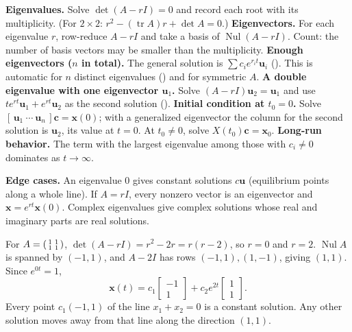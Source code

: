 \documentclass[10pt]{scrartcl}
\newcommand{\vv}[1]{\mathbf{#1}}
\DeclareMathOperator{\Nul}{Nul}
\DeclareMathOperator{\tr}{tr}
\newenvironment{howto}[1]{\begin{mdframed}[style=howtostyle,frametitle={#1}]}{\end{mdframed}}
\begin{document}
\begin{howto}{How to solve $\vv x'=A\vv x$ ($A$ constant) by the eigenvalue method}
  \begin{steps}
    \ii \textbf{Eigenvalues.} Solve $\det(A-rI)=0$ and record each root with its multiplicity. (For $2\times 2$: $r^2-(\tr A)r+\det A=0$.)
    \ii \textbf{Eigenvectors.} For each eigenvalue $r$, row-reduce $A-rI$ and take a basis of $\Nul(A-rI)$. Count: the number of basis vectors may be smaller than the multiplicity.
    \ii \textbf{Enough eigenvectors ($n$ in total).} The general solution is $\sum c_ie^{r_it}\vv u_i$ (). This is automatic for $n$ distinct eigenvalues () and for symmetric $A$.
    \ii \textbf{A double eigenvalue with one eigenvector $\vv u_1$.} Solve $(A-rI)\vv u_2=\vv u_1$ and use $te^{rt}\vv u_1+e^{rt}\vv u_2$ as the second solution ().
    \ii \textbf{Initial condition at $t_0=0$.} Solve $[\,\vv u_1\ \cdots\ \vv u_n\,]\vv c=\vv x(0)$; with a generalized eigenvector the column for the second solution is $\vv u_2$, its value at $t=0$. At $t_0\neq 0$, solve $X(t_0)\vv c=\vv x_0$.
    \ii \textbf{Long-run behavior.} The term with the largest eigenvalue among those with $c_i\neq 0$ dominates as $t\to\infty$.
  \end{steps}
  \textbf{Edge cases.} An eigenvalue $0$ gives constant solutions $c\vv u$ (equilibrium points along a whole line). If $A=rI$, every nonzero vector is an eigenvector and $\vv x=e^{rt}\vv x(0)$. Complex eigenvalues give complex solutions whose real and imaginary parts are real solutions.
\end{howto}

\begin{example*}
  For $A=\begin{psmallmatrix}1&1\\1&1\end{psmallmatrix}$, $\det(A-rI)=r^2-2r=r(r-2)$, so $r=0$ and $r=2$. $\Nul A$ is spanned by $(-1,1)$, and $A-2I$ has rows $(-1,1),(1,-1)$, giving $(1,1)$. Since $e^{0t}=1$,
  \[
    \vv x(t)=c_1\begin{bmatrix}-1\\1\end{bmatrix}+c_2e^{2t}\begin{bmatrix}1\\1\end{bmatrix}.
  \]
  Every point $c_1(-1,1)$ of the line $x_1+x_2=0$ is a constant solution. Any other solution moves away from that line along the direction $(1,1)$.
\end{example*}
\end{document}
